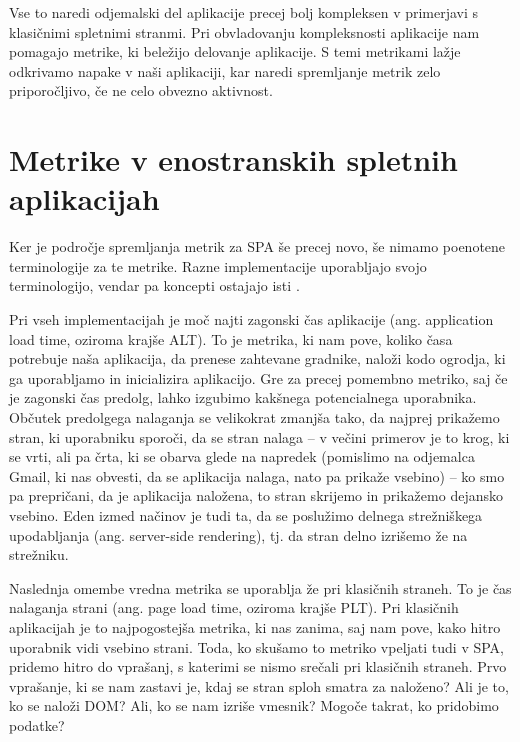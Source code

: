 \documentclass[a4paper, 12pt]{book}
\begin{document}
Vse to naredi odjemalski del aplikacije precej bolj kompleksen v primerjavi s klasičnimi spletnimi stranmi. Pri obvladovanju kompleksnosti aplikacije nam pomagajo metrike, ki beležijo delovanje aplikacije. S temi metrikami lažje odkrivamo napake v naši aplikaciji, kar naredi spremljanje metrik zelo priporočljivo, če ne celo obvezno aktivnost.

\section{Metrike v enostranskih spletnih aplikacijah}
\label{ch1:sec2}

Ker je področje spremljanja metrik za SPA še precej novo, še nimamo poenotene terminologije za te metrike. Razne implementacije uporabljajo svojo terminologijo, vendar pa koncepti ostajajo isti \cite{linkedin_rum} \cite{mezzurite_website}.

Pri vseh implementacijah je moč najti zagonski čas aplikacije (ang. application load time, oziroma krajše ALT). To je metrika, ki nam pove, koliko časa potrebuje naša aplikacija, da prenese zahtevane gradnike, naloži kodo ogrodja, ki ga uporabljamo in inicializira aplikacijo. Gre za precej pomembno metriko, saj če je zagonski čas predolg, lahko izgubimo kakšnega potencialnega uporabnika. Občutek predolgega nalaganja se velikokrat zmanjša tako, da najprej prikažemo stran, ki uporabniku sporoči, da se stran nalaga – v večini primerov je to krog, ki se vrti, ali pa črta, ki se obarva glede na napredek (pomislimo na odjemalca Gmail, ki nas obvesti, da se aplikacija nalaga, nato pa prikaže vsebino) – ko smo pa prepričani, da je aplikacija naložena, to stran skrijemo in prikažemo dejansko vsebino. Eden izmed načinov je tudi ta, da se poslužimo delnega strežniškega upodabljanja (ang. server-side rendering), tj. da stran delno izrišemo že na strežniku.

Naslednja omembe vredna metrika se uporablja že pri klasičnih straneh. To je čas nalaganja strani (ang. page load time, oziroma krajše PLT). Pri klasičnih aplikacijah je to najpogostejša metrika, ki nas zanima, saj nam pove, kako hitro uporabnik vidi vsebino strani. Toda, ko skušamo to metriko vpeljati tudi v SPA, pridemo hitro do vprašanj, s katerimi se nismo srečali pri klasičnih straneh. Prvo vprašanje, ki se nam zastavi je, kdaj se stran sploh smatra za naloženo? Ali je to, ko se naloži DOM? Ali, ko se nam izriše vmesnik? Mogoče takrat, ko pridobimo podatke?
\end{document}

